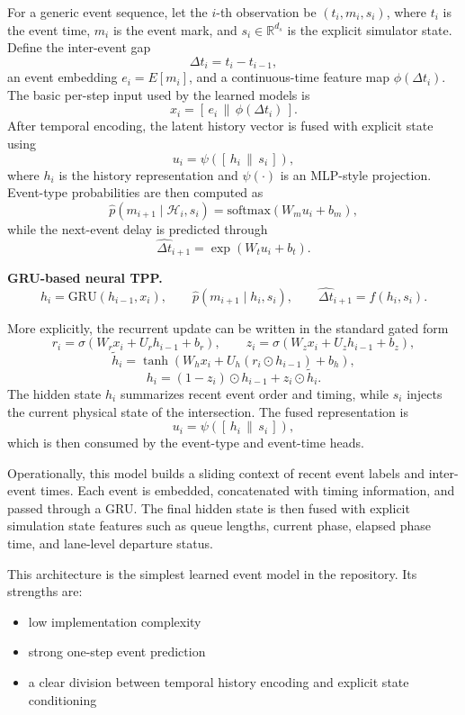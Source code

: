 \documentclass[11pt]{article}
\begin{document}
For a generic event sequence, let the \(i\)-th observation be \((t_i, m_i, s_i)\), where \(t_i\) is the event time, \(m_i\) is the event mark, and \(s_i \in \mathbb{R}^{d_s}\) is the explicit simulator state. Define the inter-event gap
\[
\Delta t_i = t_i - t_{i-1},
\]
an event embedding \(e_i = E[m_i]\), and a continuous-time feature map \(\phi(\Delta t_i)\). The basic per-step input used by the learned models is
\[
x_i = [\, e_i \, \| \, \phi(\Delta t_i) \,].
\]
After temporal encoding, the latent history vector is fused with explicit state using
\[
u_i = \psi([\, h_i \, \| \, s_i \,]),
\]
where \(h_i\) is the history representation and \(\psi(\cdot)\) is an MLP-style projection. Event-type probabilities are then computed as
\[
\hat{p}(m_{i+1}\mid \mathcal{H}_i, s_i) =
\mathrm{softmax}(W_m u_i + b_m),
\]
while the next-event delay is predicted through
\[
\hat{\Delta t}_{i+1} = \exp(W_t u_i + b_t).
\]

\textbf{GRU-based neural TPP.}
\[
h_i = \mathrm{GRU}(h_{i-1}, x_i), \qquad
\hat{p}(m_{i+1}\mid h_i, s_i), \qquad
\hat{\Delta t}_{i+1} = f(h_i, s_i).
\]

More explicitly, the recurrent update can be written in the standard gated form
\[
r_i = \sigma(W_r x_i + U_r h_{i-1} + b_r), \qquad
z_i = \sigma(W_z x_i + U_z h_{i-1} + b_z),
\]
\[
\tilde{h}_i = \tanh(W_h x_i + U_h(r_i \odot h_{i-1}) + b_h),
\]
\[
h_i = (1-z_i)\odot h_{i-1} + z_i \odot \tilde{h}_i.
\]
The hidden state \(h_i\) summarizes recent event order and timing, while \(s_i\) injects the current physical state of the intersection. The fused representation is
\[
u_i = \psi([\, h_i \, \| \, s_i \,]),
\]
which is then consumed by the event-type and event-time heads.

Operationally, this model builds a sliding context of recent event labels and inter-event times. Each event is embedded, concatenated with timing information, and passed through a GRU. The final hidden state is then fused with explicit simulation state features such as queue lengths, current phase, elapsed phase time, and lane-level departure status.

This architecture is the simplest learned event model in the repository. Its strengths are:
\begin{itemize}
  \item low implementation complexity
  \item strong one-step event prediction
  \item a clear division between temporal history encoding and explicit state conditioning
\end{itemize}
\end{document}
